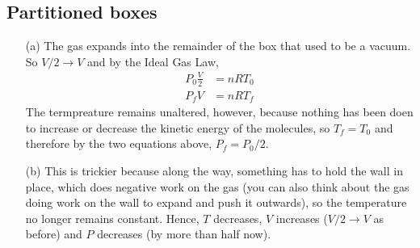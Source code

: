 \documentclass{article}
\begin{document}
\subsection{Partitioned boxes}

\begin{itemize}
	\item[(a)] The gas expands into the remainder of the box that used to be a vacuum. So $V/2\rightarrow V$ and by the Ideal Gas Law,
	\begin{align*}
	P_0\frac{V}{2}&=nRT_0 \\
	P_fV &= nRT_f
	\end{align*}
	The termpreature remains unaltered, however, because nothing has been doen to increase or decrease the kinetic energy of the molecules, so $T_f=T_0$ and therefore by the two equations above, $P_f=P_0/2$.
	\item[(b)] This is trickier because along the way, something has to hold the wall in place, which does negative work on the gas (you can also think about the gas doing work on the wall to expand and push it outwards), so the temperature no longer remains constant. Hence, $T$ decreases, $V$ increases ($V/2\rightarrow V$ as before) and $P$ decreases (by more than half now).
\end{itemize}
\end{document}
